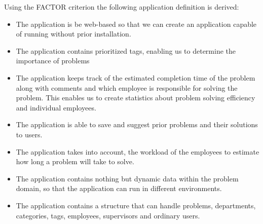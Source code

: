 Using the FACTOR criterion the following application definition is derived:
\begin{itemize}
\item The application is be web-based so that we can create an application capable of running without prior installation.
\item The application contains prioritized tags, enabling us to determine the importance of problems
\item The application keeps track of the estimated completion time of the problem along with comments and which employee is responsible for solving the problem.
This enables us to create statistics about problem solving efficiency and individual employees.
\item The application is able to save and suggest prior problems and their solutions to users.
\item The application takes into account, the workload of the employees to estimate how long a problem will take to solve.
\item The application contains nothing but dynamic data within the problem domain, so that the application can run in different environments.
\item The application contains a structure that can handle problems, departments, categories, tags, employees, supervisors and ordinary users.
\end{itemize}

\begin{comment}
Using these FACTOR criteria, we arrive at the following application definition:
\begin{itemize}
\item The application is be web-based so that we can create an application capable of running without prior installation.
\item The application should contain prioritized tags, enabling us to determine the importance of problems
\item The application should keep track of the estimated completion time of the problem along with comments and what employee is responsible for the problem. This will enable us to create statistic about problem solving efficiency and individual employees.
\item The application should be able to save and suggest prior problems and their solutions to users.
\item The application should take into account, the workload of the employees to estimate how long a problem will take to solve.
\item The application should should contain nothing but dynamic data within the problem domain, so that the application can run in different environments.
\item The application should contain a structure that can handle problems, departments, categories, tags, employees, supervisors and ordinary users.
\end{itemize}
\end{comment}


